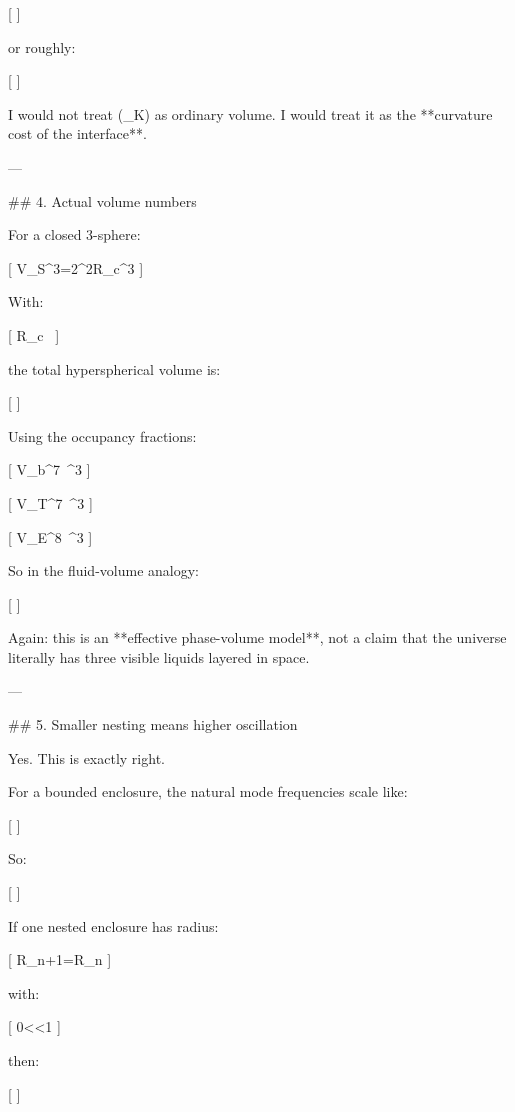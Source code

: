 [
]

or roughly:

[
]

I would not treat (\Omega_K) as ordinary volume. I would treat it as the **curvature cost of the interface**.

---

## 4. Actual volume numbers

For a closed 3-sphere:

[
V_{S^3}=2\pi^2R_c^3
]

With:

[
R_c\ 
]

the total hyperspherical volume is:

[
]

Using the occupancy fractions:

[
V_b^7\ ^3
]

[
V_T^7\ ^3
]

[
V_E^8\ ^3
]

So in the fluid-volume analogy:

[
]

Again: this is an **effective phase-volume model**, not a claim that the universe literally has three visible liquids layered in space.

---

## 5. Smaller nesting means higher oscillation

Yes. This is exactly right.

For a bounded enclosure, the natural mode frequencies scale like:

[
]

So:

[
]

If one nested enclosure has radius:

[
R_{n+1}=\lambda R_n
]

with:

[
0<\lambda<1
]

then:

[
]


